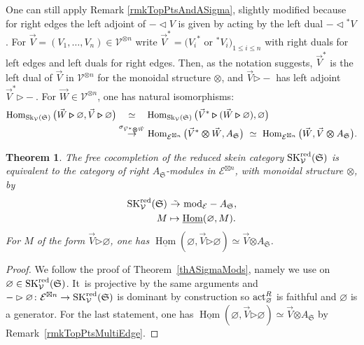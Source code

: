 \documentclass[pdftex]{sigma}%
\numberwithin{equation}{section}
\newtheorem{Theorem}{Theorem}[section]
\newcommand{\Hom}{\operatorname{Hom}}
\newcommand{\undHom}{\underline{\operatorname{Hom}}}
\newcommand{\bmrhd}{\bm{\triangleright}}
\newcommand{\bmotimes}{\bm{\otimes}}
\begin{document}
\begin{Remark}\label{rmkTopPtsMultiEdge}
One can still apply Remark \ref{rmkTopPtsAndASigma}, slightly modified because for right edges the left adjoint of $-\lhd V$ is given by acting by the left dual $-\lhd {}^*V$. For $\vec{V}=(V_1 ,\dots , V_n) \in \mathcal{V}^{\otimes n}$ write $\vec{V}^* = ({V_i}^*$ or $^*V_i)_{1\leq i\leq n}$ with right duals for left edges and left duals for right edges. Then, as the notation suggests, $\vec{V}^*$ is the left dual of $\vec{V}$ in $\mathcal{V}^{\otimes n}$ for the monoidal structure $\bmotimes$, and $\vec{V}\bmrhd -$ has left adjoint $\vec{V}^*\bmrhd -$. For $\vec{W}\in\mathcal{V}^{\otimes n}$, one has natural isomorphisms:
\begin{align*}
\Hom_{{\rm Sk}_\mathcal{V}(\mathfrak{S})}\big(\vec{W}\bmrhd \varnothing, \vec{V} \bmrhd \varnothing\big)
&\quad \simeq \quad\Hom_{{\rm Sk}_\mathcal{V}(\mathfrak{S})}\big(\vec{V}^*\bmrhd (\vec{W}\bmrhd \varnothing), \varnothing\big)
\\
& \overset{\sigma_{\vec{V}^* \bmotimes \vec{W}}}\to \Hom_{\mathcal{E}^{\boxtimes n}}\big(\vec{V}^* \bmotimes \vec{W} , A_\mathfrak{S}\big)\ \simeq\ \Hom_{\mathcal{E}^{\boxtimes n}}\big( \vec{W} ,\vec{V} \bmotimes A_\mathfrak{S}\big).
\end{align*}
\end{Remark}

\begin{Theorem}\label{thmReducedSkModASig}
The free cocompletion of the reduced skein category ${\rm SK}_\mathcal{V}^{\rm red}(\mathfrak{S})$ is equivalent to the category of right $A_\mathfrak{S}$-modules in $\mathcal{E}^{\boxtimes n}$, with monoidal structure $\bmotimes$, by
\begin{align*}
{\rm SK}_\mathcal{V}^{\rm red}(\mathfrak{S}) &\ \tilde{\to}\ {\rm mod}_\mathcal{E}-A_\mathfrak{S},
\\
M &\mapsto \undHom(\varnothing,M).
\end{align*}
For $M$ of the form $\vec{V}\bmrhd\varnothing$, one has $\undHom (\varnothing,\vec{V}\bmrhd \varnothing)\simeq\vec{V}\bmotimes A_\mathfrak{S}$.
\end{Theorem}

\begin{proof}
We follow the proof of Theorem~\ref{thASigmaMods}, namely we use \cite[Theorem~4.6]{BBJ} on $\varnothing \in {\rm SK}_\mathcal{V}^{\rm red}(\mathfrak{S})$. It~is projective by the same arguments and $-\rhd \varnothing\colon \mathcal{E}^{\boxtimes n} \to {\rm SK}_\mathcal{V}^{\rm red}(\mathfrak{S})$ is dominant by construction so ${\rm act}_\varnothing^R$ is faithful and $\varnothing$ is a generator. For the last statement, one has $\undHom(\varnothing,\vec{V}\bmrhd\varnothing) \simeq \vec{V} \bmotimes A_\mathfrak{S}$ by Remark~\ref{rmkTopPtsMultiEdge}.
\end{proof}
\end{document}
